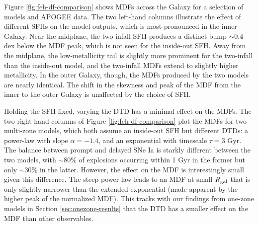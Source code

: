 \documentclass[twocolumn,twocolappendix,linenumbers]{aastex631}
\begin{document}
Figure \ref{fig:feh-df-comparison} shows MDFs across the Galaxy for a selection of models and APOGEE data. The two left-hand columns illustrate the effect of different SFHs on the model outputs, which is most pronounced in the inner Galaxy. Near the midplane, the two-infall SFH produces a distinct bump $\sim0.4$ dex below the MDF peak, which is not seen for the inside-out SFH. Away from the midplane, the low-metallicity tail is slightly more prominent for the two-infall than the inside-out model, and the two-infall MDFs extend to slightly higher metallicity. In the outer Galaxy, though, the MDFs produced by the two models are nearly identical. The shift in the skewness and peak of the MDF from the inner to the outer Galaxy is unaffected by the choice of SFH.

Holding the SFH fixed, varying the DTD has a minimal effect on the MDFs. The two right-hand columns of Figure \ref{fig:feh-df-comparison} plot the MDFs for two multi-zone models, which both assume an inside-out SFH but different DTDs: a power-law with slope $\alpha=-1.4$, and an exponential with timescale $\tau=3$ Gyr. The balance between prompt and delayed SNe Ia is starkly different between the two models, with $\sim 80\%$ of explosions occurring within 1 Gyr in the former but only $\sim 30\%$ in the latter. 
However, the effect on the MDF is interestingly small given this difference. The steep power-law leads to an MDF at small $R_{\rm gal}$ that is only slightly narrower than the extended exponential (made apparent by the higher peak of the normalized MDF). This tracks with our findings from one-zone models in Section \ref{sec:onezone-results} that the DTD has a smaller effect on the MDF than other observables.
\end{document}

